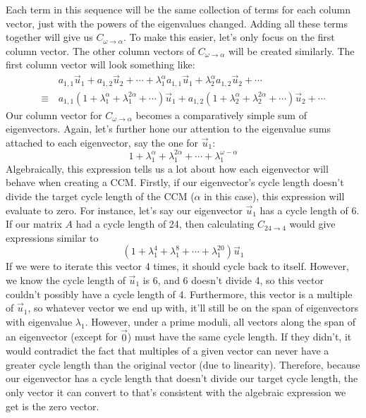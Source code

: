 \documentclass[a4paper, 12pt, reqno]{amsart}
\begin{document}
	Each term in this sequence will be the same collection of terms for each column vector, just with the powers of the eigenvalues changed. Adding all these terms
	together will give us $C_{\omega \rightarrow \alpha}$. To make this easier, let's only focus on the first column vector. The other column vectors of 
	$C_{\omega \rightarrow \alpha}$ will be created similarly. The first column vector will look something like:
	\begin{align*}
		       & \, a_{1,1}\vec{u}_1 + a_{1,2}\vec{u}_2 + \cdots + \lambda_{1}^{\alpha}a_{1,1}\vec{u}_1 + \lambda_{2}^{\alpha}a_{1,2}\vec{u}_2 + \cdots \\
		\equiv & \, a_{1,1}(1 + \lambda_{1}^{\alpha} + \lambda_{1}^{2\alpha} + \cdots)\vec{u}_{1} + 
				    a_{1,2}(1 + \lambda_{2}^{\alpha} + \lambda_{2}^{2\alpha} + \cdots)\vec{u}_{2} + \cdots 
	\end{align*}
	Our column vector for $C_{\omega \rightarrow \alpha}$ becomes a comparatively simple sum of eigenvectors. Again, let's further hone our attention to the eigenvalue sums
	attached to each eigenvector, say the one for $\vec{u}_{1}$:
	\[
		1 + \lambda_{1}^{\alpha} + \lambda_{1}^{2\alpha} + \cdots + \lambda_{1}^{\omega - \alpha}
	\]
	Algebraically, this expression tells us a lot about how each eigenvector will behave when creating a CCM. Firstly, if our eigenvector's cycle length doesn't divide the 
	target cycle length of the CCM ($\alpha$ in this case), this expression will evaluate to zero. For instance, let's say our eigenvector $\vec{u}_{1}$ has a cycle 
	length of 6. If our matrix $A$ had a cycle length of 24, then calculating $C_{24 \rightarrow 4}$ would give expressions similar to
	\[
		(1 + \lambda_{1}^{4} + \lambda_{1}^{8} + \cdots + \lambda_{1}^{20})\vec{u}_{1}
	\]
	If we were to iterate this vector 4 times, it should cycle back to itself. However, we know the cycle length of $\vec{u}_{1}$ is 6, and 6 doesn't divide 4, so
	this vector couldn't possibly have a cycle length of 4. Furthermore, this vector is a multiple of $\vec{u}_{1}$, so whatever vector we end up with, it'll still be on the
	span of eigenvectors with eigenvalue $\lambda_{1}$. However, under a prime moduli, all vectors along the span of an eigenvector (except for $\vec{0}$) must have the
	same cycle length. If they didn't, it would contradict the fact that multiples of a given vector can never have a greater cycle length than the original vector (due to
	linearity). Therefore, because our eigenvector has a cycle length that doesn't divide our target cycle length, the only vector it can convert to that's consistent with
	the algebraic expression we get is the zero vector.
	
\end{document}
